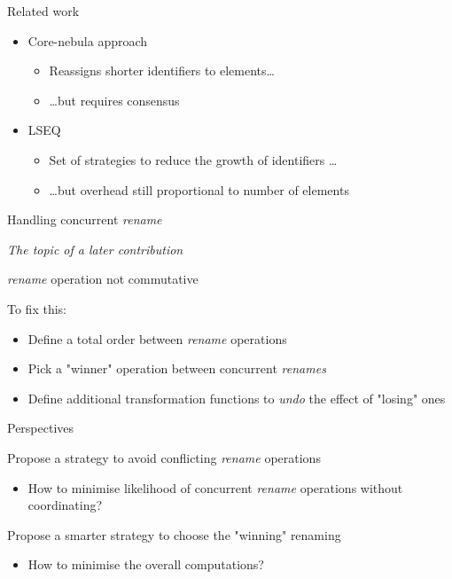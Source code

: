 \documentclass[10pt]{beamer}
\begin{document}
\begin{frame}{Related work}
  \begin{itemize}
    \item Core-nebula approach 
    \begin{itemize}
      \item Reassigns shorter identifiers to elements\dots
      \item \dots but requires consensus
    \end{itemize}
    \item LSEQ 
    \begin{itemize}
      \item Set of strategies to reduce the growth of identifiers \dots
      \item \dots but overhead still proportional to number of elements
    \end{itemize}
  \end{itemize}
\end{frame}

\begin{frame}{Handling concurrent \emph{rename}}
  \begin{center}
    \emph{The topic of a later contribution}
  \end{center}

  \begin{block}{\alert{\emph{rename} operation not commutative}}
  \end{block}

  \begin{block}{To fix this:}
    \begin{itemize}
      \item Define a total order between \emph{rename} operations
      \item Pick a "winner" operation between concurrent \emph{renames}
      \item Define additional transformation functions to \emph{undo} the effect of "losing" ones
    \end{itemize}
  \end{block}
\end{frame}

\begin{frame}{Perspectives}
  \begin{block}{Propose a strategy to avoid conflicting \emph{rename} operations}
    \begin{itemize}
      \item How to minimise likelihood of concurrent \emph{rename} operations without coordinating?
    \end{itemize}
  \end{block}

  \begin{block}{Propose a smarter strategy to choose the "winning" renaming}
    \begin{itemize}
      \item How to minimise the overall computations?
    \end{itemize}
  \end{block}
\end{frame}
\end{document}
